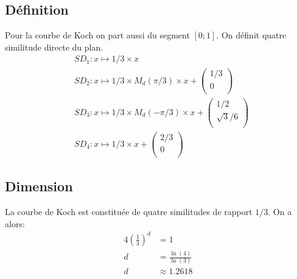 \documentclass[a4paper, 12pt]{report}
\begin{document}
			\subsection{Définition}
				Pour la courbe de Koch on part aussi du segment $[0;1]$. On définit quatre similitude directe du plan.
				\begin{align*}
					&SD_1:x\mapsto 1/3\times x\\
					&SD_2:x\mapsto 1/3\times M_d(\pi/3)\times x+\left(	\begin{array}{ccc}
															1/3\\
															0\\
														\end{array}\right)\\
					&SD_3:x\mapsto 1/3\times M_d(-\pi/3)\times x+\left(	\begin{array}{ccc}
															1/2\\
															\sqrt{3}/6\\
														\end{array}\right)\\
					&SD_4:x\mapsto 1/3\times x+\left(	\begin{array}{ccc}
															2/3\\
															0\\
														\end{array}\right)
				\end{align*}
			\subsection{Dimension}
				La courbe de Koch est constituée de quatre similitudes de rapport $1/3$. On a alors:
				\begin{align*}
					 4\left(\frac{1}{3}\right)^d	&=1\\
												d	&=\frac{\ln(4)}{\ln(3)}\\
												d	&\approx 1.2618
				\end{align*}
\newpage
\end{document}
